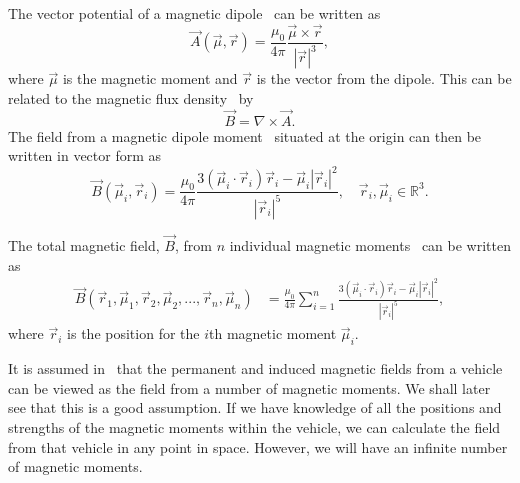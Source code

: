 The vector potential of a magnetic dipole~\cite{Nordling:1995:PHS, feynman} can be written as
\begin{equation}
 \vec{A}(\vec{\mu},\vec{r}) = \frac{\mu_0}{4\pi}\frac{\vec{\mu}\times\vec{r}}{\left|\vec{r}\right|^3},
\end{equation}
where $\vec{\mu}$ is the magnetic moment and $\vec{r}$ is the vector from the dipole. This can be related to the magnetic flux density~\cite{Nordling:1995:PHS} by
\begin{equation}
	\vec{B} = \nabla \times \vec{A}.
\end{equation}
The field from a magnetic dipole moment~\cite{imego2007} situated at the origin can then be written in vector form as
\begin{equation}
 \vec{B}(\vec{\mu}_i,\vec{r}_i)=\frac{\mu_0}{4\pi} \frac{3\left(\vec{\mu}_i \cdot \vec{r}_i \right) \vec{r}_i - \vec{\mu}_i\left|\vec{r}_i\right|^2}{\left|\vec{r}_i\right|^5},\quad \vec{r}_i, \vec{\mu}_i \in \mathbb{R}^3.
\end{equation}

The total magnetic field, $\vec{B}$, from $n$ individual magnetic moments~\cite{imego2007} can be written as
\begin{align}
\vec{B}(\vec{r}_1,\vec{\mu}_1, \vec{r}_2, \vec{\mu}_2,...,\vec{r}_n,\vec{\mu}_n) &= \frac{\mu_0}{4\pi} \sum_{i=1}^{n} \frac{3\left(\vec{\mu}_i \cdot \vec{r}_i \right) \vec{r}_i - \vec{\mu}_i\left|\vec{r}_i\right|^2}{\left|\vec{r}_i\right|^5},
\end{align}
where $\vec{r}_i$ is the position for the $i$th magnetic moment $\vec{\mu}_i$.

It is assumed in~\cite{imego2007} that the permanent and induced magnetic fields from a vehicle can be viewed as the field from a number of magnetic moments. We shall later see that this is a good assumption. If we have knowledge of all the positions and strengths of the magnetic moments within the vehicle, we can calculate the field from that vehicle in any point in space. However, we will have an infinite number of magnetic moments.

